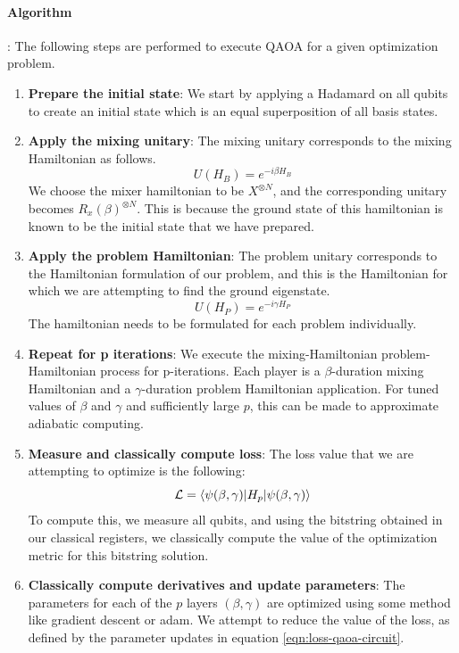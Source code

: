 \paragraph*{Algorithm}: The following steps are performed to execute QAOA for a given optimization problem.
\begin{enumerate}
    \item \textbf{Prepare the initial state}: We start by applying a Hadamard on all qubits to create an initial state which is an equal superposition of all basis states.
    \item \textbf{Apply the mixing unitary}: The mixing unitary corresponds to the mixing Hamiltonian as follows.
    \begin{equation}
        U(H_B) = e^{-i \beta H_B}
    \end{equation}
    We choose the mixer hamiltonian to be $X^{\otimes N}$, and the corresponding unitary becomes $R_x(\beta)^{\otimes N}$. This is because the ground state of this hamiltonian is known to be the initial state that we have prepared.
    \item \textbf{Apply the problem Hamiltonian}: The problem unitary corresponds to the Hamiltonian formulation of our problem, and this is the Hamiltonian for which we are attempting to find the ground eigenstate.
    \begin{equation}
        U(H_P) = e^{-i \gamma H_P}
    \end{equation}
    The hamiltonian needs to be formulated for each problem individually.
    \item \textbf{Repeat for p iterations}: We execute the mixing-Hamiltonian problem-Hamiltonian process for p-iterations. Each player is a $\beta$-duration mixing Hamiltonian and a $\gamma$-duration problem Hamiltonian application. For tuned values of $\beta$ and $\gamma$ and sufficiently large $p$, this can be made to approximate adiabatic computing.
    \item \textbf{Measure and classically compute loss}: The loss value that we are attempting to optimize is the following:
    \begin{equation}\label{eqn:loss-qaoa-circuit}
        \mathcal{L} = \braket{\psi(\beta, \gamma) \vert H_p \vert \psi(\beta, \gamma)}
    \end{equation}
    To compute this, we measure all qubits, and using the bitstring obtained in our classical registers, we classically compute the value of the optimization metric for this bitstring solution.
    \item \textbf{Classically compute derivatives and update parameters}: The parameters for each of the $p$ layers $(\beta, \gamma)$ are optimized using some method like gradient descent or adam. We attempt to reduce the value of the loss, as defined by the parameter updates in equation \ref{eqn:loss-qaoa-circuit}.
\end{enumerate}

